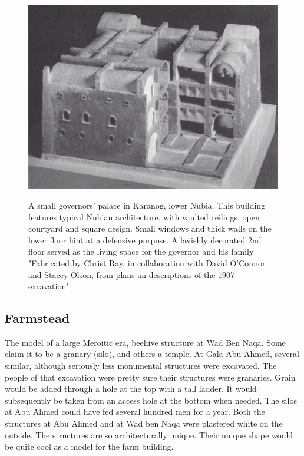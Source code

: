 \documentclass[a4paper,12pt]{scrreprt}
\begin{document}
\begin{figure}[H]
	\centering
	\includegraphics[width=\textwidth]{img/civic_center/governor_palace_karanog}\label{fig:karanog_governor_palace}
	\caption{A small governors' palace in Karanog, lower Nubia. This building features typical Nubian architecture, with vaulted ceilings, open courtyard and square design. Small windows and thick walls on the lower floor hint at a defensive purpose. A lavishly decorated 2nd floor served as the living space for the governor and his family "Fabricated by Christ Ray, in collaboration with David O'Connor and Stacey Olson, from plans an descriptions of the 1907 excavation"}
\end{figure}

\subsection{Farmstead}

The model of a large Meroitic era, beehive structure at Wad Ben Naqa. Some claim it to be a granary (silo), and others a temple. At Gala Abu Ahmed, several similar, although seriously less monumental structures were excavated. The people of that excavation were pretty sure their structures were granaries. Grain would be added through a hole at the top with a tall ladder. It would subsequently be taken from an access hole at the bottom when needed. The silos at Abu Ahmed could have fed several hundred men for a year. Both the structures at Abu Ahmed and at Wad ben Naqa were plastered white on the outside. The structures are so architecturally unique. Their unique shape would be quite cool as a model for the farm building.
\end{document}
